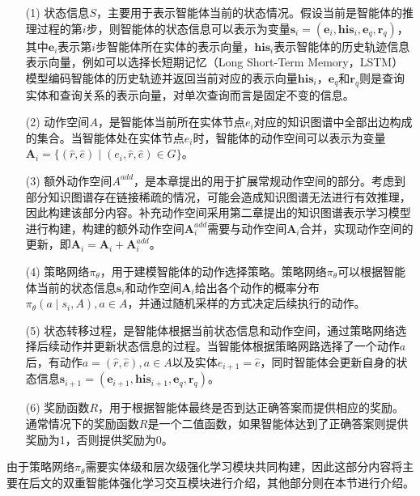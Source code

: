 \documentclass[algorithmlist, AutoFakeBold, AutoFakeSlant, figurelist, tablelist, nomlist, masters]{seuthesix}
\begin{document}
\begin{itemize}
  \item [(1)] 状态信息$S$，主要用于表示智能体当前的状态情况。假设当前是智能体的推理过程的第$i$步，则智能体的状态信息可以表示为变量$\bm{s}_i = (\bm{e}_i, \bm{his}_i, \bm{e}_q, \bm{r}_q)$，其中$\bm{e}_i$表示第$i$步智能体所在实体的表示向量，$\bm{his}_i$表示智能体的历史轨迹信息表示向量，例如可以选择长短期记忆（Long Short-Term Memory，LSTM）模型编码智能体的历史轨迹并返回当前对应的表示向量$\bm{his}_i$，$\bm{e}_q$和$\bm{r}_q$则是查询实体和查询关系的表示向量，对单次查询而言是固定不变的信息。
  \item [(2)] 动作空间$A$，是智能体当前所在实体节点$e_i$对应的知识图谱中全部出边构成的集合。当智能体处在实体节点$e_i$时，智能体的动作空间可以表示为变量$\bm{A}_i = \{(\hat{r}, \hat{e}) \mid (e_i, \hat{r}, \hat{e}) \in G\}$。
  \item [(3)] 额外动作空间$A^{add}$，是本章提出的用于扩展常规动作空间的部分。考虑到部分知识图谱存在链接稀疏的情况，可能会造成知识图谱无法进行有效推理，因此构建该部分内容。补充动作空间采用第二章提出的知识图谱表示学习模型进行构建，构建的额外动作空间$\bm{A}_{i}^{add}$需要与动作空间$\bm{A}_i$合并，实现动作空间的更新，即$\bm{A}_i = \bm{A}_i + \bm{A}_{i}^{add} $。
  \item [(4)] 策略网络$\pi_\theta$，用于建模智能体的动作选择策略。策略网络$\pi_\theta$可以根据智能体当前的状态信息$\bm{s}_i$和动作空间$\bm{A}_i$给出各个动作的概率分布$\pi_\theta(a \mid s_i, A), a \in A$，并通过随机采样的方式决定后续执行的动作。
  \item [(5)] 状态转移过程，是智能体根据当前状态信息和动作空间，通过策略网络选择后续动作并更新状态信息的过程。当智能体根据策略网路选择了一个动作$a$后，有动作$a = (\hat{r}, \hat{e}), a \in A$以及实体$e_{i+1}=\hat{e}$，同时智能体会更新自身的状态信息$\bm{s}_{i+1} = (\bm{e}_{i+1}, \bm{his}_{i+1}, \bm{e}_q, \bm{r}_q)$。
  \item [(6)] 奖励函数$R$，用于根据智能体最终是否到达正确答案而提供相应的奖励。通常情况下的奖励函数$R$是一个二值函数，如果智能体达到了正确答案则提供奖励为1，否则提供奖励为0。
\end{itemize}
由于策略网络$\pi_\theta$需要实体级和层次级强化学习模块共同构建，因此这部分内容将主要在后文的双重智能体强化学习交互模块进行介绍，其他部分则在本节进行介绍。
\end{document}
